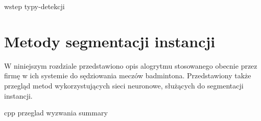 {wstep}
{typy-detekcji}

\section{Metody segmentacji instancji}
\label{sec:metody_detekcji}

W niniejszym rozdziale przedstawiono opis alogrytmu stosowanego obecnie przez firmę \blue{} w ich systemie do sędziowania meczów badmintona. Przedstawiony także przegląd metod wykorzystujących sieci neuronowe, służących do segmentacji instancji.

{cpp}
{przeglad}
{wyzwania}
{summary}
